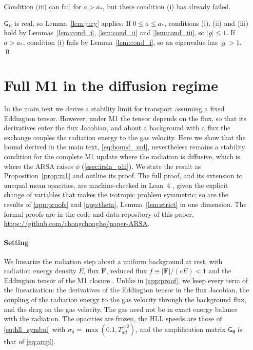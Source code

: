 \documentclass[preprint,12pt,authoryear]{elsarticle}
\newcommand{\vecF}{\mathbf{F}}
\newcommand{\tenG}{\mathsf{G}}
\begin{document}
\begin{appendix}
Condition (iii) can fail for $a > a_*$, but there condition (i) has already failed.

\begin{pfprop}
$\tenG_E$ is real, so Lemma~\ref{lem:jury} applies. If $0 \leq a \leq a_*$, conditions (i), (ii) and (iii) hold by Lemmas~\ref{lem:cond_i}, \ref{lem:cond_ii} and \ref{lem:cond_iii}, so $|g| \leq 1$. If $a > a_*$, condition (i) fails by Lemma~\ref{lem:cond_i}, so an eigenvalue has $|g| > 1$. \qed
\end{pfprop}

\section{Full M1 in the diffusion regime}
\label{app:m1}

In the main text we derive a stability limit for transport assuming a fixed Eddington tensor. However, under M1 the tensor depends on the flux, so that its derivatives enter the flux Jacobian, and about a background with a flux the exchange couples the radiation energy to the gas velocity. Here we show that the bound derived in the main text, \autoref{eq:bound_md}, nevertheless remains a stability condition for the complete M1 update where the radiation is diffusive, which is where the ARSA raises $\phi$ (\autoref{ssec:irsla_phi}). We state the result as Proposition~\ref{prop:m1} and outline its proof. The full proof, and its extension to unequal mean opacities, are machine-checked in Lean~4 \citep{deMoura21a, mathlib20a}, given the explicit change of variables that makes the isotropic problem symmetric; so are the results of \ref{app:proofs} and \ref{app:theta}, Lemma~\ref{lem:strict} in one dimension. The formal proofs are in the code and data repository of this paper, \url{https://github.com/chongchonghe/paper-ARSA}.

\paragraph{Setting} We linearize the radiation step about a uniform background at rest, with radiation energy density $E$, flux $\vecF$, reduced flux $f \equiv |\vecF|/(cE) < 1$ and the Eddington tensor of the M1 closure \citep{Levermore84a}. Unlike in \ref{app:proof}, we keep every term of the linearization: the derivatives of the Eddington tensor in the flux Jacobian, the coupling of the radiation energy to the gas velocity through the background flux, and the drag on the gas velocity. The gas need not be in exact energy balance with the radiation. The opacities are frozen, the HLL speeds are those of \autoref{eq:hll_symbol} with $\sigma_d = \max(0.1, T_{dd}^{1/2})$, and the amplification matrix $\tenG_{\boldsymbol{\theta}}$ is that of \autoref{eq:ampl}.


\end{appendix}
\end{document}
